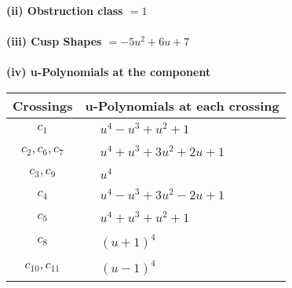 \documentclass[1p]{elsarticle_modified}
\theoremstyle{definition}
\begin{document}
\flushleft \textbf{(ii) Obstruction class $= 1$}\\~\\
\flushleft \textbf{(iii) Cusp Shapes $= -5 u^2+6 u+7$}\\~\\
\newpage\renewcommand{\arraystretch}{1}
\flushleft \textbf{(iv) u-Polynomials at the component}\newline \\
\begin{tabular}{m{50pt}|m{274pt}}
Crossings & \hspace{64pt}u-Polynomials at each crossing \\
\hline $$\begin{aligned}c_{1}\end{aligned}$$&$\begin{aligned}
&u^4- u^3+u^2+1
\end{aligned}$\\
\hline $$\begin{aligned}c_{2},c_{6},c_{7}\end{aligned}$$&$\begin{aligned}
&u^4+u^3+3 u^2+2 u+1
\end{aligned}$\\
\hline $$\begin{aligned}c_{3},c_{9}\end{aligned}$$&$\begin{aligned}
&u^4
\end{aligned}$\\
\hline $$\begin{aligned}c_{4}\end{aligned}$$&$\begin{aligned}
&u^4- u^3+3 u^2-2 u+1
\end{aligned}$\\
\hline $$\begin{aligned}c_{5}\end{aligned}$$&$\begin{aligned}
&u^4+u^3+u^2+1
\end{aligned}$\\
\hline $$\begin{aligned}c_{8}\end{aligned}$$&$\begin{aligned}
&(u+1)^4
\end{aligned}$\\
\hline $$\begin{aligned}c_{10},c_{11}\end{aligned}$$&$\begin{aligned}
&(u-1)^4
\end{aligned}$\\
\hline
\end{tabular}\\~\\
\end{document}
